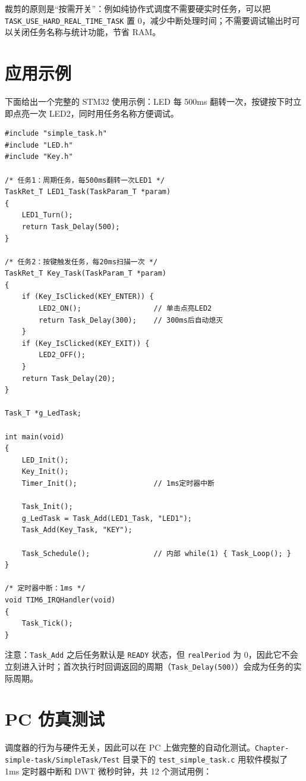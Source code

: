 裁剪的原则是“按需开关”：例如纯协作式调度不需要硬实时任务，可以把 \texttt{TASK\_USE\_HARD\_REAL\_TIME\_TASK} 置 0，减少中断处理时间；不需要调试输出时可以关闭任务名称与统计功能，节省 RAM。

\section{应用示例}

下面给出一个完整的 STM32 使用示例：LED 每 500ms 翻转一次，按键按下时立即点亮一次 LED2，同时用任务名称方便调试。

\begin{lstlisting}[style=c]
#include "simple_task.h"
#include "LED.h"
#include "Key.h"

/* 任务1：周期任务，每500ms翻转一次LED1 */
TaskRet_T LED1_Task(TaskParam_T *param)
{
    LED1_Turn();
    return Task_Delay(500);
}

/* 任务2：按键触发任务，每20ms扫描一次 */
TaskRet_T Key_Task(TaskParam_T *param)
{
    if (Key_IsClicked(KEY_ENTER)) {
        LED2_ON();                 // 单击点亮LED2
        return Task_Delay(300);    // 300ms后自动熄灭
    }
    if (Key_IsClicked(KEY_EXIT)) {
        LED2_OFF();
    }
    return Task_Delay(20);
}

Task_T *g_LedTask;

int main(void)
{
    LED_Init();
    Key_Init();
    Timer_Init();                  // 1ms定时器中断

    Task_Init();
    g_LedTask = Task_Add(LED1_Task, "LED1");
    Task_Add(Key_Task, "KEY");

    Task_Schedule();               // 内部 while(1) { Task_Loop(); }
}

/* 定时器中断：1ms */
void TIM6_IRQHandler(void)
{
    Task_Tick();
}
\end{lstlisting}

注意：\texttt{Task\_Add} 之后任务默认是 \texttt{READY} 状态，但 \texttt{realPeriod} 为 0，因此它不会立刻进入计时；首次执行时回调返回的周期（\texttt{Task\_Delay(500)}）会成为任务的实际周期。

\section{PC 仿真测试}

调度器的行为与硬件无关，因此可以在 PC 上做完整的自动化测试。\texttt{Chapter-simple-task/SimpleTask/Test} 目录下的 \texttt{test\_simple\_task.c} 用软件模拟了 1ms 定时器中断和 DWT 微秒时钟，共 12 个测试用例：


